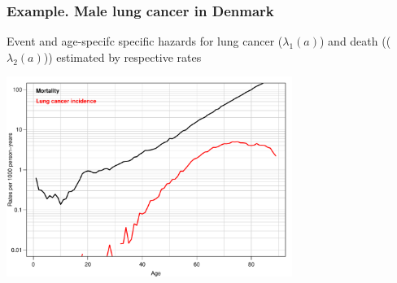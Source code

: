 \documentclass[handout,12pt,dvipsnames,t]{beamer}
\begin{document}
\begin{frame}
\frametitle{Example. Male lung cancer in Denmark}

Event and age-specifc specific hazards for lung cancer ($\lambda_1(a)$) and death (($\lambda_2(a)$)) estimated by respective rates

\includegraphics[height=6.5cm]{lung-ca-rates}
\end{frame}
  
\end{document}
